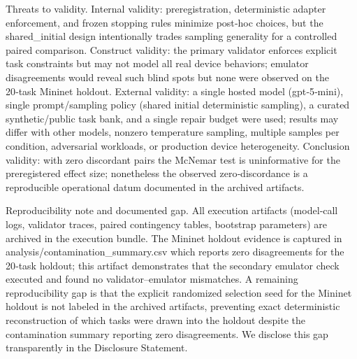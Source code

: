 \documentclass[conference]{IEEEtran}
\begin{document}
Threats to validity. Internal validity: preregistration, deterministic adapter enforcement, and frozen stopping rules minimize post‑hoc choices, but the shared\_initial design intentionally trades sampling generality for a controlled paired comparison. Construct validity: the primary validator enforces explicit task constraints but may not model all real device behaviors; emulator disagreements would reveal such blind spots but none were observed on the 20‑task Mininet holdout. External validity: a single hosted model (gpt‑5‑mini), single prompt/sampling policy (shared initial deterministic sampling), a curated synthetic/public task bank, and a single repair budget were used; results may differ with other models, nonzero temperature sampling, multiple samples per condition, adversarial workloads, or production device heterogeneity. Conclusion validity: with zero discordant pairs the McNemar test is uninformative for the preregistered effect size; nonetheless the observed zero‑discordance is a reproducible operational datum documented in the archived artifacts.

Reproducibility note and documented gap. All execution artifacts (model‑call logs, validator traces, paired contingency tables, bootstrap parameters) are archived in the execution bundle. The Mininet holdout evidence is captured in analysis/contamination\_summary.csv which reports zero disagreements for the 20‑task holdout; this artifact demonstrates that the secondary emulator check executed and found no validator--emulator mismatches. A remaining reproducibility gap is that the explicit randomized selection seed for the Mininet holdout is not labeled in the archived artifacts, preventing exact deterministic reconstruction of which tasks were drawn into the holdout despite the contamination summary reporting zero disagreements. We disclose this gap transparently in the Disclosure Statement.
\end{document}
